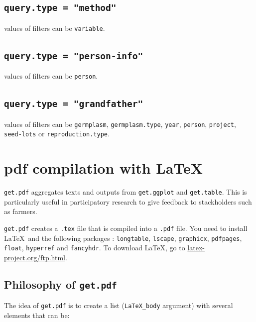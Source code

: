 \documentclass{article}\usepackage[]{graphicx}\usepackage[]{color}
\renewcommand{\sl}{seed-lots}
\begin{document}
\subsection{\texttt{query.type = "method"}}
values of filters can be \texttt{variable}.


\subsection{\texttt{query.type = "person-info"}}
values of filters can be \texttt{person}.


\subsection{\texttt{query.type = "grandfather"}}
values of filters can be \texttt{germplasm}, \texttt{germplasm.type}, \texttt{year}, \texttt{person}, \texttt{project}, \texttt{\sl} or \texttt{reproduction.type}.



\newpage


\section{pdf compilation with \LaTeX}
\label{pdf}

\texttt{get.pdf} aggregates texts and outputs from \texttt{get.ggplot} and \texttt{get.table}.
This is particularly useful in participatory research to give feedback to stackholders such as farmers.

\texttt{get.pdf} creates a \texttt{.tex} file that is compiled into a \texttt{.pdf} file.
You need to install \LaTeX~and the following packages : \texttt{longtable}, \texttt{lscape}, \texttt{graphicx}, \texttt{pdfpages}, \texttt{float}, \texttt{hyperref} and \texttt{fancyhdr}. 
To download LaTeX, go to \url{latex-project.org/ftp.html}.


\subsection{Philosophy of \texttt{get.pdf} }

The idea of \texttt{get.pdf} is to create a list (\texttt{LaTeX\_body} argument) with several elements that can be:
\end{document}
